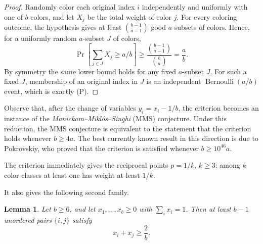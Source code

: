 \documentclass[12pt]{article}
\newtheorem{lemma}{Lemma}
\newcommand{\Ber}{\operatorname{Bernoulli}}
\newcommand{\review}[1]{\begin{reviewbox}#1\end{reviewbox}}
\begin{document}
\begin{proof}
Randomly color each original index \(i\) independently and uniformly with one
of \(b\) colors, and let \(X_j\) be the total weight of color \(j\).  For every
coloring outcome, the hypothesis gives at least \(\binom{b-1}{a-1}\) good
\(a\)-subsets of colors.  Hence, for a uniformly random \(a\)-subset \(J\) of
colors,
\[
       \Pr\!\left[\sum_{j\in J}X_j\ge a/b\right]\ge
       \frac{\binom{b-1}{a-1}}{\binom ba}=\frac ab .
\]
By symmetry the same lower bound holds for any fixed \(a\)-subset \(J\).  For
such a fixed \(J\), membership of an original index in \(J\) is an independent
\(\Ber(a/b)\) event, which is exactly (P).
\end{proof}

\review{Observe that, after the change of variables \(y_i=x_i-1/b\), the criterion becomes an instance of the \emph{Manickam--Mikl{\'o}s--Singhi} (MMS) conjecture. Under this reduction, the MMS conjecture is equivalent to the statement that the criterion holds whenever \(b\ge 4a\). The best currently known result in this direction is due to Pokrovskiy, who proved that the criterion is satisfied whenever \(b\ge 10^{46}a\).}

The criterion immediately gives the reciprocal points \(p=1/k\), \(k\ge3\):
among \(k\) color classes at least one has weight at least \(1/k\).

It also gives the following second family.

\begin{lemma}\label{lem:pairs}
Let \(b\ge6\), and let \(x_1,\ldots,x_b\ge0\) with \(\sum_i x_i=1\).  Then at
least \(b-1\) unordered pairs \(\{i,j\}\) satisfy
\[
       x_i+x_j\ge \frac2b .
\]
\end{lemma}
\end{document}
